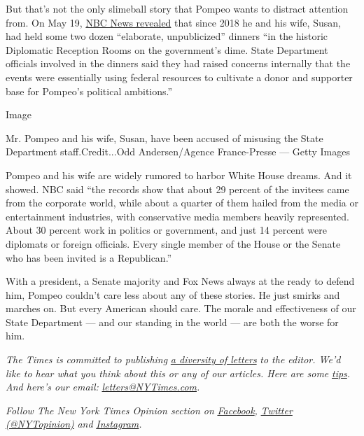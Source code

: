 But that's not the only slimeball story that Pompeo wants to distract
attention from. On May 19,
\href{https://www.nbcnews.com/politics/politics-news/pompeo-s-elite-taxpayer-funded-dinners-raise-new-concerns-n1210746}{NBC
News revealed} that since 2018 he and his wife, Susan, had held some two
dozen ``elaborate, unpublicized'' dinners ``in the historic Diplomatic
Reception Rooms on the government's dime. State Department officials
involved in the dinners said they had raised concerns internally that
the events were essentially using federal resources to cultivate a donor
and supporter base for Pompeo's political ambitions.''

Image

Mr. Pompeo and his wife, Susan, have been accused of misusing the State
Department staff.Credit...Odd Andersen/Agence France-Presse --- Getty
Images

Pompeo and his wife are widely rumored to harbor White House dreams. And
it showed. NBC said ``the records show that about 29 percent of the
invitees came from the corporate world, while about a quarter of them
hailed from the media or entertainment industries, with conservative
media members heavily represented. About 30 percent work in politics or
government, and just 14 percent were diplomats or foreign officials.
Every single member of the House or the Senate who has been invited is a
Republican.''

With a president, a Senate majority and Fox News always at the ready to
defend him, Pompeo couldn't care less about any of these stories. He
just smirks and marches on. But every American should care. The morale
and effectiveness of our State Department --- and our standing in the
world --- are both the worse for him.

\emph{The Times is committed to publishing}
\href{https://www.nytimes3xbfgragh.onion/2019/01/31/opinion/letters/letters-to-editor-new-york-times-women.html}{\emph{a
diversity of letters}} \emph{to the editor. We'd like to hear what you
think about this or any of our articles. Here are some}
\href{https://help.nytimes3xbfgragh.onion/hc/en-us/articles/115014925288-How-to-submit-a-letter-to-the-editor}{\emph{tips}}\emph{.
And here's our email:}
\href{mailto:letters@NYTimes.com}{\emph{letters@NYTimes.com}}\emph{.}

\emph{Follow The New York Times Opinion section on}
\href{https://www.facebookcorewwwi.onion/nytopinion}{\emph{Facebook}}\emph{,}
\href{http://twitter.com/NYTOpinion}{\emph{Twitter (@NYTopinion)}}
\emph{and}
\href{https://www.instagram.com/nytopinion/}{\emph{Instagram}}\emph{.}

